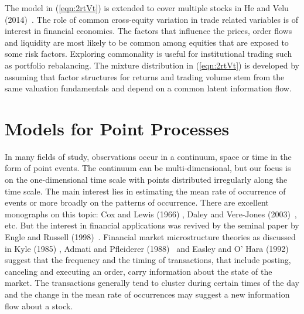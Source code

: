 The model in (\ref{eqn:2rtVt}) is extended to cover multiple stocks in He and Velu (2014)~\cite{hevelu}. The role of common cross-equity variation in trade related variables is of interest in financial economics. The factors that influence the prices, order flows and liquidity are most likely to be common among equities that are exposed to some risk factors. Exploring commonality is useful for institutional trading such as portfolio rebalancing. The mixture distribution in (\ref{eqn:2rtVt}) is developed by assuming that factor structures for returns and trading volume stem from the same valuation fundamentals and depend on a common latent information flow.  


\section{Models for Point Processes}


In many fields of study, observations occur in a continuum, space or time in the form of point events. The continuum can be multi-dimensional, but our focus is on the one-dimensional time scale with points distributed irregularly along the time scale. The main interest lies in estimating the mean rate of occurrence of events or more broadly on the patterns of occurrence. There are excellent monographs on this topic: Cox and Lewis (1966) \cite{cox1966}, Daley and Vere-Jones (2003)~\cite{daley2003}, etc. But the interest in financial applications was revived by the seminal paper by Engle and Russell (1998)~\cite{engle1998}. Financial market microstructure theories as discussed in Kyle (1985) \cite{kyle1985}, Admati and Pfleiderer (1988)~\cite{admati1988theory} and Easley and O' Hara (1992)~\cite{easley1992} suggest that the frequency and the timing of transactions, that include posting, canceling and executing an order, carry information about the state of the market. The transactions generally tend to cluster during certain times of the day and the change in the mean rate of occurrences may suggest a new information flow about a stock.


